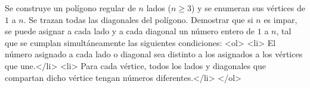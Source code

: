 Se construye un polígono regular de $n$ lados ($n \geq 3$) y se enumeran sus vértices de $1$ a $n$. Se trazan todas las diagonales del polígono. Demostrar que si $n$ es impar, se puede asignar a cada lado y a cada diagonal un número entero de $1$ a $n$, tal que se cumplan simultáneamente las siguientes condiciones:
<ol>
  <li> El número asignado a cada lado o diagonal sea distinto a los asignados a los vértices que une.</li>
  <li> Para cada vértice, todos los lados y diagonales que compartan dicho vértice tengan números diferentes.</li>
</ol>
